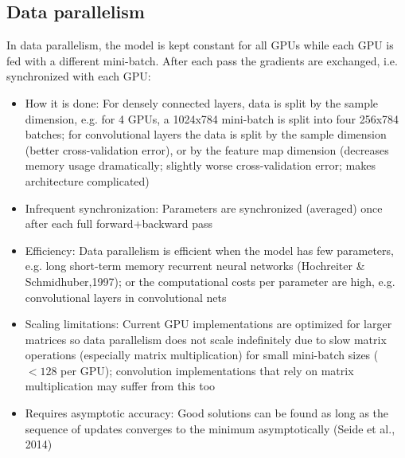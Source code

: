 \documentclass{article} %
\begin{document}
\subsection{Data parallelism}

In data parallelism, the model is kept constant for all GPUs while each GPU is fed with a different mini-batch. After each pass the gradients are exchanged, i.e. synchronized with each GPU:
 \begin{itemize} 	
 	\item How it is done: For densely connected layers, data is split by the sample dimension, e.g. for 4 GPUs, a 1024x784 mini-batch is split into four 256x784 batches; for convolutional layers the data is split by the sample dimension (better cross-validation error), or by the feature map dimension (decreases memory usage dramatically; slightly worse cross-validation error; makes architecture complicated)
 	\item Infrequent synchronization: Parameters are synchronized (averaged) once after each full forward+backward pass
 	\item Efficiency: Data parallelism is efficient when the model has few parameters, e.g. long short-term memory recurrent neural networks (Hochreiter \& Schmidhuber,1997); or the computational costs per parameter are high, e.g. convolutional layers in convolutional nets
 	\item Scaling limitations: Current GPU implementations are optimized for larger matrices so data parallelism does not scale indefinitely due to slow matrix operations (especially matrix multiplication) for small mini-batch sizes ($< 128$ per GPU); convolution implementations that rely on matrix multiplication may suffer from this too
 	\item Requires asymptotic accuracy: Good solutions can be found as long as the sequence of updates converges to the minimum asymptotically (Seide et al., 2014)
 \end{itemize}
\end{document}
